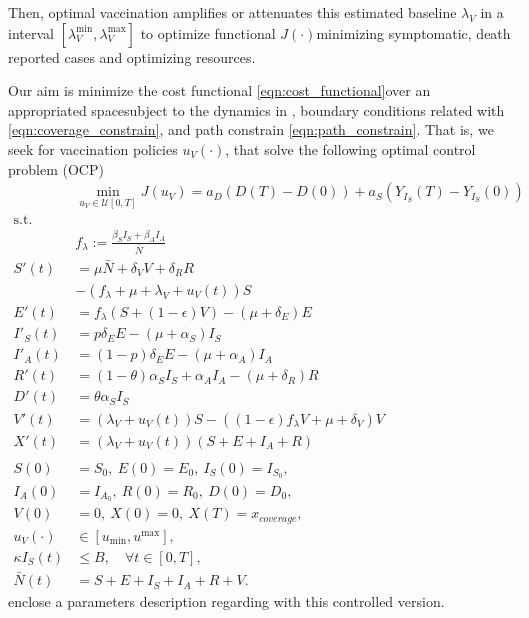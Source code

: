 Then, optimal vaccination amplifies or attenuates this estimated baseline
$\lambda_V$ in a interval $[\lambda_V^{\min}, \lambda_V^{\max}]$
to optimize functional $J(\cdot)$\textemdash minimizing
symptomatic, death reported cases and optimizing resources.

Our aim is minimize the cost functional
\eqref{eqn:cost_functional}\textemdash over an appropriated
space\textemdash subject to the dynamics in
, boundary conditions related with
\eqref{eqn:coverage_constrain}, and path
constrain \eqref{eqn:path_constrain}.
That is, we seek for vaccination policies $u_V(\cdot)$, that
solve the following optimal control problem (OCP)%
\begin{equation}
    \label{eqn:optimal_control_problem}
    \begin{aligned}
        & \min_{u_V \in \mathcal{U}[0, T]}
        J(u_V) =
        a_D ( D(T) - D(0)) +
        a_S (Y_{I_S}(T) - Y_{I_S}(0))
        \\
        \text{s.t.} &
        \\
        &f_{\lambda}
        :=
        \frac{\beta_S I_S + \beta_AI_A}{\bar{N}}
        \\
        S'(t)
        &=
        \mu \bar{N} + \delta_V V + \delta_R R
        \\
        &-
        (f_{\lambda} + \mu + \lambda_V +  u_V(t)) S
        \\
        E'(t)
        &=
        f_{\lambda} (S + (1-\epsilon) V)
        - (\mu+\delta_E) E
        \\
        I'_S(t)
        &=p
        \delta_E
        E-(\mu + \alpha_S) I_S
        \\
        I'_A(t)
        &= (1 - p) \delta_E E-(\mu + \alpha_A) I_A
        \\
        R'(t)
        &= (1 - \theta) \alpha_S I_S + \alpha_A I_A
        - (\mu + \delta_R) R
        \\
        D'(t)&=
        \theta \alpha_S I_S
        \\
        V'(t)&=
        (\lambda_V + u_V(t)) S -
        \left(
        (1 -\epsilon) f_{\lambda} V +
        \mu + \delta_V
        \right) V
        \\
        X'(t)&=
        (\lambda_V + u_V(t))(S + E + I_A + R)
        \\
        \\
        S(0) &= S_0, \ E(0) = E_0, \ I_S(0) = I_{S_{0}},
        \\
        I_A(0) &= I_{A_{0}}, \ R(0) = R_0, \ D(0) = D_0,
        \\
        V(0) &= 0, \ X(0) = 0, \ X(T) = x_{coverage},
        \\
        u_V(\cdot) & \in [u_{\min}, u^{\max}],
        \\
        \kappa I_S(t) & \leq B, \quad \forall t \in [0, T],
        \\
        \bar{N}(t) &= S + E + I_S + I_A + R + V.
    \end{aligned}
\end{equation}
 enclose a parameters description
regarding with this controlled
version.

